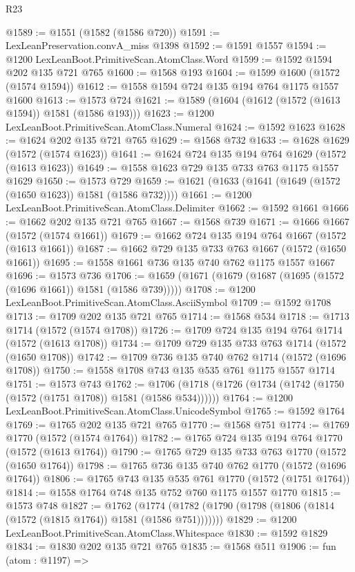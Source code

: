 \begin{lexlean}{R23}
\begin{coremodule}
@1589 := @1551 (@1582 (@1586 @720))
@1591 := LexLeanPreservation.convA_miss @1398
@1592 := @1591 @1557
@1594 := @1200 LexLeanBoot.PrimitiveScan.AtomClass.Word
@1599 := @1592 @1594 @202 @135 @721 @765
@1600 := @1568 @193
@1604 := @1599 @1600 (@1572 (@1574 @1594))
@1612 := @1558 @1594 @724 @135 @194 @764 @1175 @1557 @1600
@1613 := @1573 @724
@1621 := @1589 (@1604 (@1612 (@1572 (@1613 @1594)) @1581 (@1586 @193)))
@1623 := @1200 LexLeanBoot.PrimitiveScan.AtomClass.Numeral
@1624 := @1592 @1623
@1628 := @1624 @202 @135 @721 @765
@1629 := @1568 @732
@1633 := @1628 @1629 (@1572 (@1574 @1623))
@1641 := @1624 @724 @135 @194 @764 @1629 (@1572 (@1613 @1623))
@1649 := @1558 @1623 @729 @135 @733 @763 @1175 @1557 @1629
@1650 := @1573 @729
@1659 := @1621 (@1633 (@1641 (@1649 (@1572 (@1650 @1623)) @1581 (@1586 @732))))
@1661 := @1200 LexLeanBoot.PrimitiveScan.AtomClass.Delimiter
@1662 := @1592 @1661
@1666 := @1662 @202 @135 @721 @765
@1667 := @1568 @739
@1671 := @1666 @1667 (@1572 (@1574 @1661))
@1679 := @1662 @724 @135 @194 @764 @1667 (@1572 (@1613 @1661))
@1687 := @1662 @729 @135 @733 @763 @1667 (@1572 (@1650 @1661))
@1695 := @1558 @1661 @736 @135 @740 @762 @1175 @1557 @1667
@1696 := @1573 @736
@1706 := @1659 (@1671 (@1679 (@1687 (@1695 (@1572 (@1696 @1661)) @1581 (@1586 @739)))))
@1708 := @1200 LexLeanBoot.PrimitiveScan.AtomClass.AsciiSymbol
@1709 := @1592 @1708
@1713 := @1709 @202 @135 @721 @765
@1714 := @1568 @534
@1718 := @1713 @1714 (@1572 (@1574 @1708))
@1726 := @1709 @724 @135 @194 @764 @1714 (@1572 (@1613 @1708))
@1734 := @1709 @729 @135 @733 @763 @1714 (@1572 (@1650 @1708))
@1742 := @1709 @736 @135 @740 @762 @1714 (@1572 (@1696 @1708))
@1750 := @1558 @1708 @743 @135 @535 @761 @1175 @1557 @1714
@1751 := @1573 @743
@1762 := @1706 (@1718 (@1726 (@1734 (@1742 (@1750 (@1572 (@1751 @1708)) @1581 (@1586 @534))))))
@1764 := @1200 LexLeanBoot.PrimitiveScan.AtomClass.UnicodeSymbol
@1765 := @1592 @1764
@1769 := @1765 @202 @135 @721 @765
@1770 := @1568 @751
@1774 := @1769 @1770 (@1572 (@1574 @1764))
@1782 := @1765 @724 @135 @194 @764 @1770 (@1572 (@1613 @1764))
@1790 := @1765 @729 @135 @733 @763 @1770 (@1572 (@1650 @1764))
@1798 := @1765 @736 @135 @740 @762 @1770 (@1572 (@1696 @1764))
@1806 := @1765 @743 @135 @535 @761 @1770 (@1572 (@1751 @1764))
@1814 := @1558 @1764 @748 @135 @752 @760 @1175 @1557 @1770
@1815 := @1573 @748
@1827 := @1762
    (@1774 (@1782 (@1790 (@1798 (@1806 (@1814 (@1572 (@1815 @1764)) @1581 (@1586 @751)))))))
@1829 := @1200 LexLeanBoot.PrimitiveScan.AtomClass.Whitespace
@1830 := @1592 @1829
@1834 := @1830 @202 @135 @721 @765
@1835 := @1568 @511
@1906 := fun (atom : @1197) =>

\end{coremodule}
\end{lexlean}
